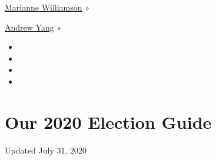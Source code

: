 \href{https://www.nytimes.com/interactive/2020/us/elections/marianne-williamson.html}{Marianne
Williamson} »

\href{https://www.nytimes.com/interactive/2020/us/elections/andrew-yang.html}{Andrew
Yang} »

\begin{itemize}
\item
\item
\item
\item
\end{itemize}

\hypertarget{our-2020-election-guide}{%
\section{Our 2020 Election Guide}\label{our-2020-election-guide}}

Updated July 31, 2020

